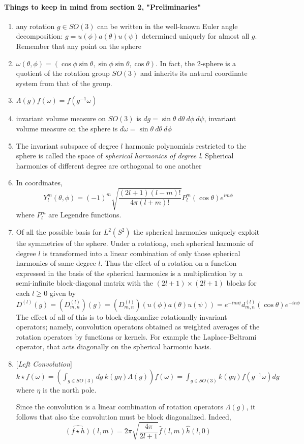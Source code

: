 \paragraph{Things to keep in mind from section 2, "Preliminaries"}
\begin{enumerate}
	\item any rotation $g\in SO(3)$ can be written in the well-known Euler angle decomposition: $g = u(\phi)a(\theta)u(\psi)$ determined uniquely for almost all $g$. Remember that any point on the sphere
	\item $\omega(\theta, \phi) = \left(\cos\phi\sin\theta, \sin\phi\sin\theta, \cos\theta\right)$. In fact, the 2-sphere is a quotient of the rotation group $SO(3)$ and inherits its natural coordinate system from that of the group.
	\item $\Lambda(g)f(\omega) = f(g^{-1}\omega)$
	\item invariant volume measure on $SO(3)$ is $dg=\sin\theta\ d\theta\ d\phi\ d\psi$, invariant volume measure on the sphere is $d\omega = \sin\theta\ d\theta\ d\phi$
	\item The invariant subspace of degree $l$ harmonic polynomials restricted to the sphere is called the space of \textit{spherical harmonics of degree l}. Spherical harmonics of different degree are orthogonal to one another
	\item In coordinates, 
	$$Y_l^m(\theta, \phi) =(-1)^m\sqrt{\frac{(2l+1)(l-m)!}{4\pi(l+m)!}}P_l^m(\cos\theta)e^{im\phi}$$
	where $P_l^m$ are Legendre functions.
	\item Of all the possible basis for $L^2(S^2)$ the spherical harmonics uniquely exploit the symmetries of the sphere. Under a rotation$g$, each spherical harmonic of degree $l$ is transformed into a linear combination of only those spherical harmonics of same degree $l$.
	Thus the effect of a rotation on a function expressed in the basis of the spherical harmonics is a multiplication by a semi-infinite block-diagonal matrix with the $(2l+1)\times(2l+1)$ blocks for each $l \geq 0$ given by $$D^{(l)}(g) = \left(D^{(l)}_{m,n}\right) (g) =  \left(D^{(l)}_{m,n}\right)(u(\phi)a(\theta)u(\psi)) = e^{-im\psi}d^{(l)}_{m,n}(\cos \theta) e^{-in\phi}$$
	The effect of all of this is to block-diagonalize rotationally invariant operators; namely, convolution operators obtained as weighted averages of the rotation operators by functions or kernels. For example the Laplace-Beltrami operator, that acts diagonally on the spherical harmonic basis.
	\item \begin{definition}{[\textit{Left Convolution}]}\\
		$k\star f(\omega) = \left(\int_{g\in SO(3)}dg\ k(g\eta)\Lambda(g)\right)f(\omega) = \int_{g\in SO(3)}k(g\eta)f(g^{-1}\omega)dg$
		where $\eta$ is the north pole. 
	\end{definition}
Since the convolution is a linear combination of rotation operators $\Lambda(g)$, it follows that also the convolution must be block diagonalized. Indeed,
$$\hat {(f \star h)}(l,m) = 2\pi \sqrt{\frac{4\pi}{2l+1}}\hat f(l,m) \hat h(l,0) $$


\end{enumerate}
